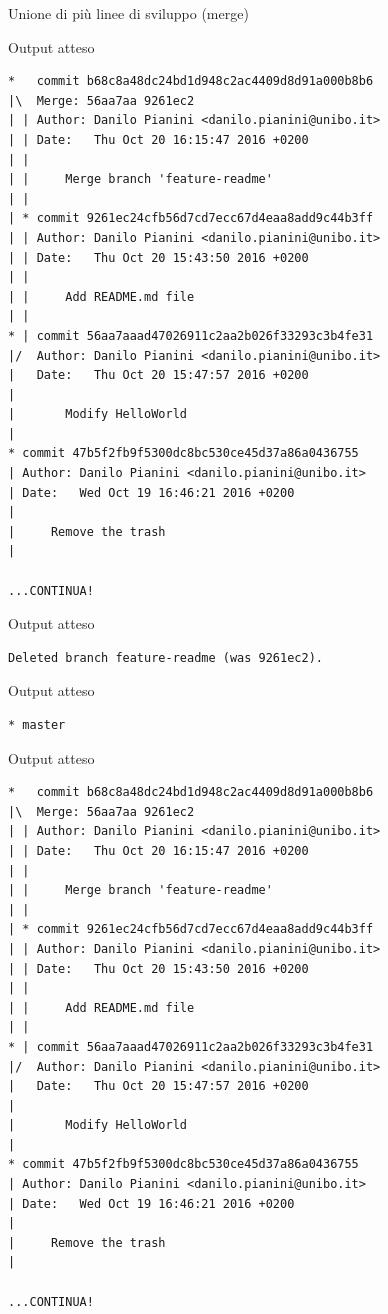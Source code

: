 \documentclass[xcolor=dvipsnames,presentation]{beamer}
\begin{document}
\begin{frame}{Unione di più linee di sviluppo (merge)}
	\begin{block}{Output atteso}
		\begin{Verbatim}[fontsize=\tiny]
*   commit b68c8a48dc24bd1d948c2ac4409d8d91a000b8b6
|\  Merge: 56aa7aa 9261ec2
| | Author: Danilo Pianini <danilo.pianini@unibo.it>
| | Date:   Thu Oct 20 16:15:47 2016 +0200
| |
| |     Merge branch 'feature-readme'
| |
| * commit 9261ec24cfb56d7cd7ecc67d4eaa8add9c44b3ff
| | Author: Danilo Pianini <danilo.pianini@unibo.it>
| | Date:   Thu Oct 20 15:43:50 2016 +0200
| |
| |     Add README.md file
| |
* | commit 56aa7aaad47026911c2aa2b026f33293c3b4fe31
|/  Author: Danilo Pianini <danilo.pianini@unibo.it>
|   Date:   Thu Oct 20 15:47:57 2016 +0200
|
|       Modify HelloWorld
|
* commit 47b5f2fb9f5300dc8bc530ce45d37a86a0436755
| Author: Danilo Pianini <danilo.pianini@unibo.it>
| Date:   Wed Oct 19 16:46:21 2016 +0200
|
|     Remove the trash
|

...CONTINUA!
		\end{Verbatim}
	\end{block}
	\begin{block}{Output atteso}
		\begin{Verbatim}[fontsize=\scriptsize]
Deleted branch feature-readme (was 9261ec2).
		\end{Verbatim}
	\end{block}
	\begin{block}{Output atteso}
		\begin{Verbatim}[fontsize=\scriptsize]
* master
		\end{Verbatim}
	\end{block}
	\begin{block}{Output atteso}
		\begin{Verbatim}[fontsize=\tiny]
*   commit b68c8a48dc24bd1d948c2ac4409d8d91a000b8b6
|\  Merge: 56aa7aa 9261ec2
| | Author: Danilo Pianini <danilo.pianini@unibo.it>
| | Date:   Thu Oct 20 16:15:47 2016 +0200
| |
| |     Merge branch 'feature-readme'
| |
| * commit 9261ec24cfb56d7cd7ecc67d4eaa8add9c44b3ff
| | Author: Danilo Pianini <danilo.pianini@unibo.it>
| | Date:   Thu Oct 20 15:43:50 2016 +0200
| |
| |     Add README.md file
| |
* | commit 56aa7aaad47026911c2aa2b026f33293c3b4fe31
|/  Author: Danilo Pianini <danilo.pianini@unibo.it>
|   Date:   Thu Oct 20 15:47:57 2016 +0200
|
|       Modify HelloWorld
|
* commit 47b5f2fb9f5300dc8bc530ce45d37a86a0436755
| Author: Danilo Pianini <danilo.pianini@unibo.it>
| Date:   Wed Oct 19 16:46:21 2016 +0200
|
|     Remove the trash
|

...CONTINUA!
		\end{Verbatim}
	\end{block}
\end{frame}
\end{document}
